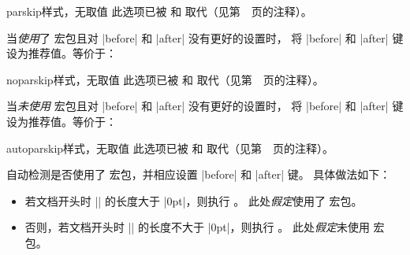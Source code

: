 \clearpage

\begin{docTcbKey}[][doc updated=2017-02-01]{parskip}{}{样式，无取值}
  此选项已被  和 
  取代（见第~\pageref{subsec:surroundings}~页的注释）。\par
  当\emph{使用}了  宏包且对 |before| 和 |after| 没有更好的设置时，
  将 |before| 和 |after| 键设为推荐值。等价于：
\begin{dispListing}
\end{dispListing}
\end{docTcbKey}

\begin{docTcbKey}[][doc updated=2017-02-01]{noparskip}{}{样式，无取值}
  此选项已被  和 
  取代（见第~\pageref{subsec:surroundings}~页的注释）。\par
  当\emph{未使用}  宏包且对 |before| 和 |after| 没有更好的设置时，
  将 |before| 和 |after| 键设为推荐值。等价于：
\begin{dispListing}
\end{dispListing}
\end{docTcbKey}

\begin{docTcbKey}{autoparskip}{}{样式，无取值}
  此选项已被  和 
  取代（见第~\pageref{subsec:surroundings}~页的注释）。\par
  自动检测是否使用了  宏包，并相应设置 |before| 和 |after| 键。
  具体做法如下：
  \begin{itemize}
  \item 若文档开头时 |\parskip| 的长度大于 |0pt|，则执行 。
    此处\emph{假定}使用了  宏包。
  \item 否则，若文档开头时 |\parskip| 的长度不大于 |0pt|，则执行 。
    此处\emph{假定}未使用  宏包。
  \end{itemize}
\end{docTcbKey}


